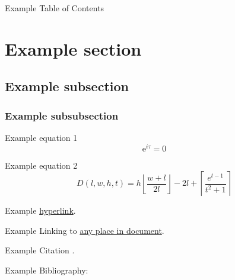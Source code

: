 \documentclass[11pt]{article}
\begin{document}
Example Table of Contents

\tableofcontents

\section{Example section}
\subsection{Example subsection}
\subsubsection{Example subsubsection}

Example equation 1
\begin{equation}
    \mathrm{e}^{i\tau} = 0
\end{equation}

Example equation 2
\begin{equation}
    D(l,w,h,t) = h \left\lfloor \frac{w+l}{2l} \right\rfloor - 2l + \left\lceil \frac{e^{t-1}}{t^2+1} \right\rceil
\end{equation}

Example \href{https://www.ntnu.edu}{hyperlink}.

Example Linking to \hyperlink{anyplace}{any place in document}.

Example Citation \cite{example1988}.

Example Bibliography:

\printbibliography
\end{document}
